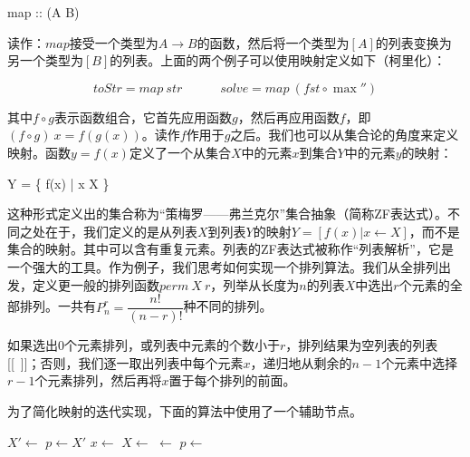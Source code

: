 \documentclass[b5paper]{ctexart}
\begin{document}
\be
map :: (A \to B) \to [A] \to [B]
\ee

读作：$map$接受一个类型为$A \to B$的函数，然后将一个类型为$[A]$的列表变换为另一个类型为$[B]$的列表。上面的两个例子可以使用映射定义如下（柯里化）：

\[
\textstyle
toStr = map\ str \quad \quad \quad
solve = map\ (fst \circ \max'')
\]

其中$f \circ g$表示函数组合，它首先应用函数$g$，然后再应用函数$f$，即$(f \circ g)\ x = f(g(x))$。读作$f$作用于$g$之后。我们也可以从集合论的角度来定义映射。函数$y = f(x)$定义了一个从集合$X$中的元素$x$到集合$Y$中的元素$y$的映射：

\be
Y = \{ f(x) | x \in X \}
\ee

  \label{sec:zf-expr}
这种形式定义出的集合称为“策梅罗——弗兰克尔”集合抽象（简称ZF表达式）\cite{algo-fp}。不同之处在于，我们定义的是从列表$X$到列表$Y$的映射$Y = [f(x) | x \gets X]$，而不是集合的映射。其中可以含有重复元素。列表的ZF表达式被称作“列表解析”，它是一个强大的工具。作为例子，我们思考如何实现一个排列算法。我们从全排列\cite{algo-fp}\cite{erlang}出发，定义更一般的排列函数$perm\ X\ r$，列举从长度为$n$的列表$X$中选出$r$个元素的全部排列。一共有$P_n^r = \dfrac{n!}{(n-r)!}$种不同的排列。

\be
{}
\ee

如果选出0个元素排列，或列表中元素的个数小于$r$，排列结果为空列表的列表[[\ ]]；否则，我们逐一取出列表中每个元素$x$，递归地从剩余的$n-1$个元素中选择$r-1$个元素排列，然后再将$x$置于每个排列的前面。

为了简化映射的迭代实现，下面的算法中使用了一个辅助节点。

\begin{algorithmic}[1]
  \State $X' \gets$  
  \State $p \gets X'$
    \State $x \gets$ 
    \State $X \gets$ 
    \State {} $\gets$ 
    \State $p \gets$ 
  \EndWhile
  \State \Return {} 
\EndFunction
\end{algorithmic}
\end{document}
